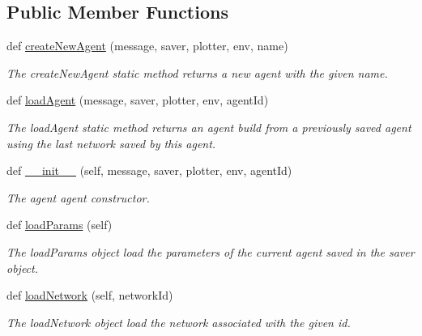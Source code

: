 \subsection*{Public Member Functions}
\begin{DoxyCompactItemize}
\item 
def \hyperlink{classDQN-Deepmind-NIPS-2013_1_1agent_1_1DeepMindAgent_1_1DeepMindAgent_a9ea279d64a3b2bced6901c55df78c7e4}{create\+New\+Agent} (message, saver, plotter, env, name)
\begin{DoxyCompactList}\small\item\em The create\+New\+Agent static method returns a new agent with the given name. \end{DoxyCompactList}\item 
def \hyperlink{classDQN-Deepmind-NIPS-2013_1_1agent_1_1DeepMindAgent_1_1DeepMindAgent_a6271c469fb0446dd92a94ce447ba3695}{load\+Agent} (message, saver, plotter, env, agent\+Id)
\begin{DoxyCompactList}\small\item\em The load\+Agent static method returns an agent build from a previously saved agent using the last network saved by this agent. \end{DoxyCompactList}\item 
def \hyperlink{classDQN-Deepmind-NIPS-2013_1_1agent_1_1DeepMindAgent_1_1DeepMindAgent_a8bbe0f1127879b400142d5cf6fea5384}{\+\_\+\+\_\+init\+\_\+\+\_\+} (self, message, saver, plotter, env, agent\+Id)
\begin{DoxyCompactList}\small\item\em The agent agent constructor. \end{DoxyCompactList}\item 
def \hyperlink{classDQN-Deepmind-NIPS-2013_1_1agent_1_1DeepMindAgent_1_1DeepMindAgent_ae3b30ec9438fbaa91c440415e43844fe}{load\+Params} (self)
\begin{DoxyCompactList}\small\item\em The load\+Params object load the parameters of the current agent saved in the saver object. \end{DoxyCompactList}\item 
def \hyperlink{classDQN-Deepmind-NIPS-2013_1_1agent_1_1DeepMindAgent_1_1DeepMindAgent_a63ce7439d1d1989c262489e08e04e204}{load\+Network} (self, network\+Id)
\begin{DoxyCompactList}\small\item\em The load\+Network object load the network associated with the given id. \end{DoxyCompactList}\end{DoxyCompactItemize}
